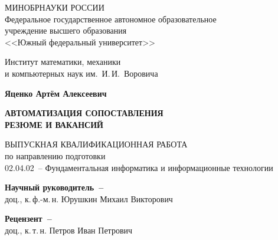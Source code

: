 


\thispagestyle{empty}
\begin{singlespacing}
    \begin{center}

        МИНОБРНАУКИ РОССИИ\\ [12pt]
        Федеральное государственное автономное образовательное\\
        учреждение высшего образования\\
        <<Южный федеральный университет>>

        \vspace{\baselineskip}
        Институт математики, механики\\
        и компьютерных наук им.~И.\,И.~Воровича


        \vfill
        \textbf{Яценко Артём Алексеевич}

        \vspace{15mm}
        {\bf АВТОМАТИЗАЦИЯ СОПОСТАВЛЕНИЯ \\
            РЕЗЮМЕ И ВАКАНСИЙ}

        \vspace{15mm}
        ВЫПУСКНАЯ КВАЛИФИКАЦИОННАЯ РАБОТА\\
        по направлению подготовки\\
        02.04.02~-- Фундаментальная информатика и информационные технологии

        \vspace{10mm}
        \textbf{Научный руководитель~--}\\
        доц., к.\,ф.-м.\,н. Юрушкин Михаил Викторович

        \vspace{7mm}
        \textbf{Рецензент~--}\\
        доц., к.\,т.\,н. Петров Иван Петрович



\end{center}
\end{singlespacing}
